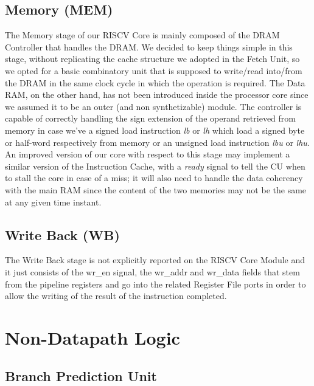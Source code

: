 \documentclass[10pt,  english, makeidx, a4paper, titlepage, oneside]{book}
\begin{document}
\section{Memory (MEM)}
The Memory stage of our RISCV Core is mainly composed of the DRAM Controller that handles the DRAM.\newline
We decided to keep things simple in this stage, without replicating the cache structure we adopted in the Fetch Unit, so we opted for a basic combinatory unit that is supposed to write/read into/from the DRAM in the same clock cycle in which the operation is required. The Data RAM, on the other hand, has not been introduced inside the processor core since we assumed it to be an outer (and non synthetizable) module. The controller is capable of correctly handling the sign extension of the operand retrieved from memory in case we've a signed load instruction \textit{lb} or \textit{lh} which load a signed byte or half-word respectively from memory or an unsigned load instruction \textit{lbu} or \textit{lhu}.\newline
An improved version of our core with respect to this stage may implement a similar version of the Instruction Cache, with a \textit{ready} signal to tell the CU when to stall the core in case of a miss; it will also need to handle the data coherency with the main RAM since the content of the two memories may not be the same at any given time instant.

\section{Write Back (WB)}
The Write Back stage is not explicitly reported on the RISCV Core Module and it just consists of the wr\_en signal, the wr\_addr and wr\_data fields that stem from the pipeline registers and go into the related Register File ports in order to allow the writing of the result of the instruction completed.

\chapter{Non-Datapath Logic}

\section{Branch Prediction Unit}
\end{document}
